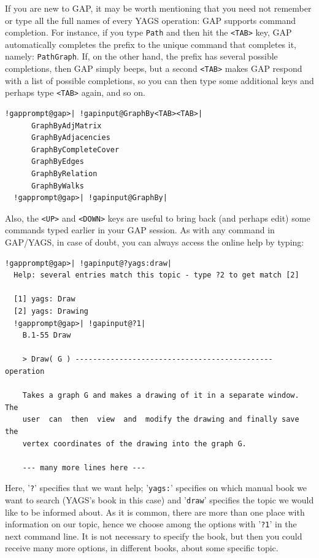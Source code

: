 \documentclass[a4paper,11pt]{report}
\begin{document}
{{If you are new to \textsf{GAP}, it may be worth mentioning that you need not remember or type all the full
names of every \textsf{YAGS} operation: \textsf{GAP} supports command completion. For instance, if you type \texttt{Path} and then hit the \texttt{{\textless}TAB{\textgreater}} key, \textsf{GAP} automatically completes the prefix to the unique command that completes it,
namely: \texttt{PathGraph}. If, on the other hand, the prefix has several possible completions, then \textsf{GAP} simply beeps, but a second \texttt{{\textless}TAB{\textgreater}} makes \textsf{GAP} respond with a list of possible completions, so you can then type some
additional keys and perhaps type \texttt{{\textless}TAB{\textgreater}} again, and so on. 


\begin{Verbatim}[commandchars=!@|,fontsize=\small,frame=single,label=Example]
  !gapprompt@gap>| !gapinput@GraphBy<TAB><TAB>|
      GraphByAdjMatrix
      GraphByAdjacencies
      GraphByCompleteCover
      GraphByEdges
      GraphByRelation
      GraphByWalks
  !gapprompt@gap>| !gapinput@GraphBy|
\end{Verbatim}
 

Also, the \texttt{{\textless}UP{\textgreater}} and \texttt{{\textless}DOWN{\textgreater}} keys are useful to bring back (and perhaps edit) some commands typed earlier
in your \textsf{GAP} session. As with any command in \textsf{GAP}/\textsf{YAGS}, in case of doubt, you can always access the online help by typing: 


\begin{Verbatim}[commandchars=!@|,fontsize=\small,frame=single,label=Example]
  !gapprompt@gap>| !gapinput@?yags:draw|
  Help: several entries match this topic - type ?2 to get match [2]
  
  [1] yags: Draw
  [2] yags: Drawing
  !gapprompt@gap>| !gapinput@?1|
    B.1-55 Draw
    
    > Draw( G ) --------------------------------------------- operation
    
    Takes a graph G and makes a drawing of it in a separate window. The
    user  can  then  view  and  modify the drawing and finally save the
    vertex coordinates of the drawing into the graph G.
    
    --- many more lines here ---
\end{Verbatim}
 

Here, '\texttt{?}' specifies that we want help; '\texttt{yags:}' specifies on which manual book we want to search (\textsf{YAGS}'s book in this case) and '\texttt{draw}' specifies the topic we would like to be informed about. As it is common,
there are more than one place with information on our topic, hence we choose
among the options with '\texttt{?1}' in the next command line. It is not necessary to specify the book, but then
you could receive many more options, in different books, about some specific
topic. 

}}
\end{document}
